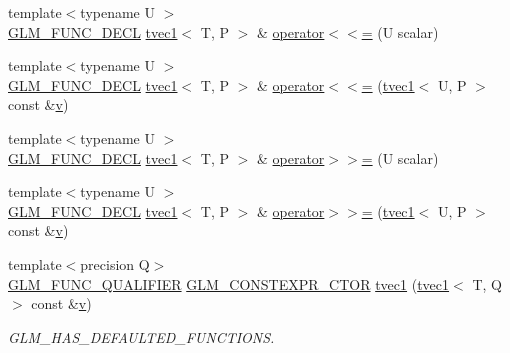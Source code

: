 \begin{DoxyCompactItemize}
\item 
{\footnotesize template$<$typename U $>$ }\\\mbox{\hyperlink{setup_8hpp_ab2d052de21a70539923e9bcbf6e83a51}{G\+L\+M\+\_\+\+F\+U\+N\+C\+\_\+\+D\+E\+CL}} \mbox{\hyperlink{structglm_1_1tvec1}{tvec1}}$<$ T, P $>$ \& \mbox{\hyperlink{structglm_1_1tvec1_a1fb987744e67cc6944d621a1a658eb20}{operator$<$$<$=}} (U scalar)
\item 
{\footnotesize template$<$typename U $>$ }\\\mbox{\hyperlink{setup_8hpp_ab2d052de21a70539923e9bcbf6e83a51}{G\+L\+M\+\_\+\+F\+U\+N\+C\+\_\+\+D\+E\+CL}} \mbox{\hyperlink{structglm_1_1tvec1}{tvec1}}$<$ T, P $>$ \& \mbox{\hyperlink{structglm_1_1tvec1_a2ed7c375c837621c846ee0b31104e34a}{operator$<$$<$=}} (\mbox{\hyperlink{structglm_1_1tvec1}{tvec1}}$<$ U, P $>$ const \&\mbox{\hyperlink{glad_8h_a14cfbe2fc2234f5504618905b69d1e06}{v}})
\item 
{\footnotesize template$<$typename U $>$ }\\\mbox{\hyperlink{setup_8hpp_ab2d052de21a70539923e9bcbf6e83a51}{G\+L\+M\+\_\+\+F\+U\+N\+C\+\_\+\+D\+E\+CL}} \mbox{\hyperlink{structglm_1_1tvec1}{tvec1}}$<$ T, P $>$ \& \mbox{\hyperlink{structglm_1_1tvec1_ae9110ae99e82eba81f9b347c8b4f7f77}{operator$>$$>$=}} (U scalar)
\item 
{\footnotesize template$<$typename U $>$ }\\\mbox{\hyperlink{setup_8hpp_ab2d052de21a70539923e9bcbf6e83a51}{G\+L\+M\+\_\+\+F\+U\+N\+C\+\_\+\+D\+E\+CL}} \mbox{\hyperlink{structglm_1_1tvec1}{tvec1}}$<$ T, P $>$ \& \mbox{\hyperlink{structglm_1_1tvec1_ac7b30c3a71fc6b28c4bceae5a0e92057}{operator$>$$>$=}} (\mbox{\hyperlink{structglm_1_1tvec1}{tvec1}}$<$ U, P $>$ const \&\mbox{\hyperlink{glad_8h_a14cfbe2fc2234f5504618905b69d1e06}{v}})
\item 
{\footnotesize template$<$precision Q$>$ }\\\mbox{\hyperlink{setup_8hpp_a33fdea6f91c5f834105f7415e2a64407}{G\+L\+M\+\_\+\+F\+U\+N\+C\+\_\+\+Q\+U\+A\+L\+I\+F\+I\+ER}} \mbox{\hyperlink{setup_8hpp_ad34178a09666081abdb573c14d1f4a5a}{G\+L\+M\+\_\+\+C\+O\+N\+S\+T\+E\+X\+P\+R\+\_\+\+C\+T\+OR}} \mbox{\hyperlink{structglm_1_1tvec1_a3fa1c02ae48daf7eec33fa1f8ce1661f}{tvec1}} (\mbox{\hyperlink{structglm_1_1tvec1}{tvec1}}$<$ T, Q $>$ const \&\mbox{\hyperlink{glad_8h_a14cfbe2fc2234f5504618905b69d1e06}{v}})
\begin{DoxyCompactList}\small\item\em G\+L\+M\+\_\+\+H\+A\+S\+\_\+\+D\+E\+F\+A\+U\+L\+T\+E\+D\+\_\+\+F\+U\+N\+C\+T\+I\+O\+NS. \end{DoxyCompactList}\item 

\end{DoxyCompactItemize}
